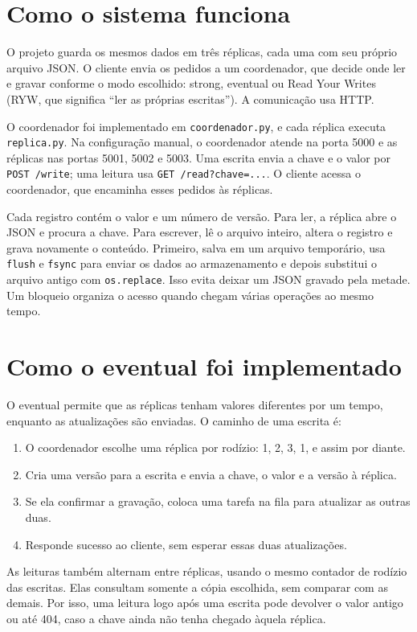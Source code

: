 \section{Como o sistema funciona}
O projeto guarda os mesmos dados em três réplicas, cada uma com seu próprio
arquivo JSON. O cliente envia os pedidos a um coordenador, que decide onde
ler e gravar conforme o modo escolhido: strong, eventual ou Read Your Writes
(RYW, que significa ``ler as próprias escritas''). A comunicação usa HTTP.

O coordenador foi implementado em \texttt{coordenador.py}, e cada réplica
executa \texttt{replica.py}. Na configuração manual, o coordenador atende na
porta 5000 e as réplicas nas portas 5001, 5002 e 5003. Uma escrita envia a
chave e o valor por \texttt{POST /write}; uma leitura usa
\texttt{GET /read?chave=...}. O cliente acessa o coordenador, que encaminha
esses pedidos às réplicas.

Cada registro contém o valor e um número de versão. Para ler, a réplica abre
o JSON e procura a chave. Para escrever, lê o arquivo inteiro, altera o
registro e grava novamente o conteúdo. Primeiro, salva em um arquivo
temporário, usa \texttt{flush} e \texttt{fsync} para enviar os dados ao
armazenamento e depois substitui o arquivo antigo com \texttt{os.replace}.
Isso evita deixar um JSON gravado pela metade. Um bloqueio organiza o acesso
quando chegam várias operações ao mesmo tempo.

\section{Como o eventual foi implementado}
O eventual permite que as réplicas tenham valores diferentes por um tempo,
enquanto as atualizações são enviadas. O caminho de uma escrita é:
\begin{enumerate}
\item O coordenador escolhe uma réplica por rodízio: 1, 2, 3, 1, e assim por diante.
\item Cria uma versão para a escrita e envia a chave, o valor e a versão à réplica.
\item Se ela confirmar a gravação, coloca uma tarefa na fila para atualizar as outras duas.
\item Responde sucesso ao cliente, sem esperar essas duas atualizações.
\end{enumerate}

As leituras também alternam entre réplicas, usando o mesmo contador de
rodízio das escritas. Elas consultam somente a cópia escolhida, sem comparar
com as demais. Por isso, uma leitura logo após uma escrita pode devolver
o valor antigo ou até 404, caso a chave ainda não tenha chegado àquela réplica.

